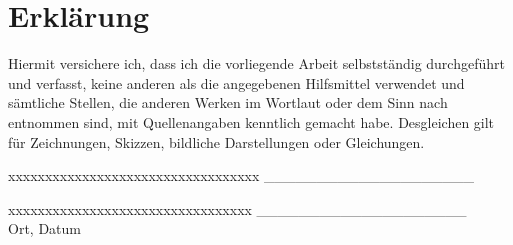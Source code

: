 \thispagestyle{plain}

\section*{Erklärung}
\vskip 20pt
Hiermit versichere ich, dass ich die vorliegende Arbeit selbstständig durchgeführt und verfasst, keine anderen als die angegebenen Hilfsmittel verwendet und sämtliche Stellen, die anderen Werken im Wortlaut oder dem Sinn nach entnommen sind, mit Quellenangaben kenntlich gemacht habe. Desgleichen gilt für Zeichnungen, Skizzen, bildliche Darstellungen oder Gleichungen.
\vskip 70pt

	\begin{minipage}[c]{6cm}
		\begin{tabbing}
			xxxxxxxxxxxxxxxxxxxxxxxxxxxxxxxxxx\kill
			\_\_\_\_\_\_\_\_\_\_\_\_\_\_\_\_\_\_\_\_ \\
			\vornamenachname
		\end{tabbing}
	\end{minipage}
	\hfill
	\begin{minipage}[c]{10cm}
		\begin{tabbing}
			xxxxxxxxxxxxxxxxxxxxxxxxxxxxxxxxx\kill
			\_\_\_\_\_\_\_\_\_\_\_\_\_\_\_\_\_\_\_\_ \\
			Ort, Datum
		\end{tabbing}
	\end{minipage}